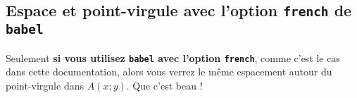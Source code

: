 \documentclass[12pt,a4paper]{article}
\begin{document}

	\subsection{Espace et point-virgule avec l'option \texttt{french} de \texttt{babel}}

Seulement \textbf{si vous utilisez \texttt{babel} avec l'option \texttt{french}}, comme c'est le cas dans cette documentation, alors vous verrez le même espacement autour du point-virgule dans $A(x;y)$. Que c'est beau !
\end{document}

